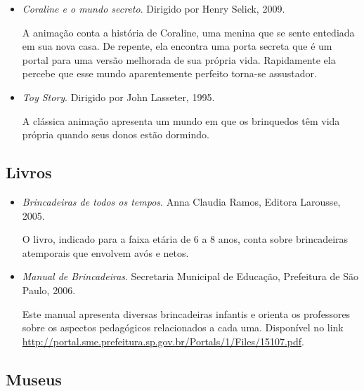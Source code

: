 \documentclass[11pt]{extarticle}
\begin{document}
\begin{itemize}

\item \textit{Coraline e o mundo secreto}. Dirigido por Henry Selick, 2009.

A animação conta a história de Coraline, uma menina que se sente entediada em sua nova casa. De repente, ela encontra uma porta secreta que é um portal para uma versão melhorada de sua própria vida. Rapidamente ela percebe que esse mundo aparentemente perfeito torna-se assustador.

\item \textit{Toy Story}. Dirigido por John Lasseter, 1995.

A clássica animação apresenta um mundo em que os brinquedos têm vida própria quando seus donos estão dormindo. 

\end{itemize}

\subsection{Livros}

\begin{itemize}

\item \textit{Brincadeiras de todos os tempos}. Anna Claudia Ramos, Editora Larousse, 2005.

O livro, indicado para a faixa etária de 6 a 8 anos, conta sobre brincadeiras atemporais que envolvem avós e netos.

\item \textit{Manual de Brincadeiras}. Secretaria Municipal de Educação, Prefeitura de São Paulo, 2006.

Este manual apresenta diversas brincadeiras infantis e orienta os professores sobre os aspectos pedagógicos relacionados a cada uma. Disponível no link \url{http://portal.sme.prefeitura.sp.gov.br/Portals/1/Files/15107.pdf}.

\end{itemize}

\subsection{Museus}
\end{document}
